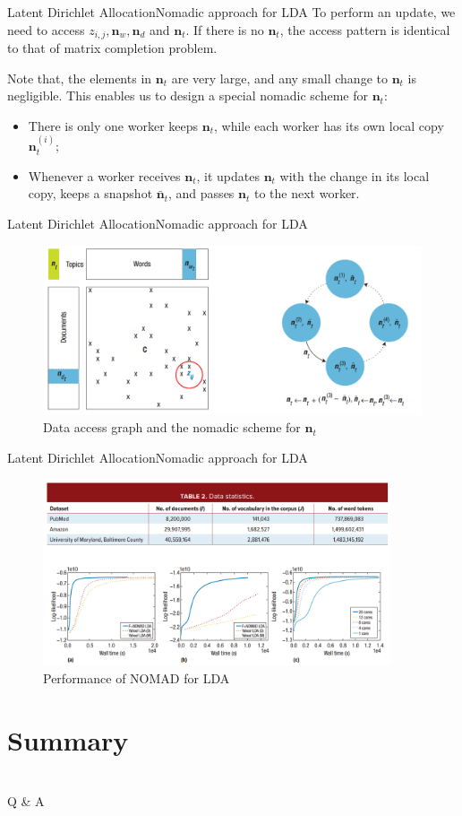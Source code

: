 \documentclass{beamer}
\renewcommand{\vec}{\mathbf}
\begin{document}
  \begin{frame}{Latent Dirichlet Allocation}{Nomadic approach for LDA}
    To perform an update, we need to access $z_{i, j}, \vec{n}_w, \vec{n}_d$ and $\vec{n}_t$. If there is no $\vec{n}_t$, the access pattern is identical to that of matrix completion problem. \par
    \pause
    Note that, the elements in $\vec{n}_t$ are very large, and any small change to $\vec{n}_t$ is negligible. This enables us to design a special nomadic scheme for $\vec{n}_t$:
    \begin{itemize}
      \item There is only one worker keeps $\vec{n}_t$, while each worker has its own local copy $\vec{n}_t^{(i)}$;
      \item Whenever a worker receives $\vec{n}_t$, it updates $\vec{n}_t$ with the change in its local copy, keeps a snapshot $\vec{\bar{n}}_t$, and passes $\vec{n}_t$ to the next worker.
    \end{itemize}
  \end{frame}
  
  \begin{frame}{Latent Dirichlet Allocation}{Nomadic approach for LDA}
    \begin{figure}
      \includegraphics[height = 5cm]{cgs_data.png}
      \caption{Data access graph and the nomadic scheme for $\vec{n}_t$}
    \end{figure}
  \end{frame}
  
  \begin{frame}{Latent Dirichlet Allocation}{Nomadic approach for LDA}
    \begin{figure}
      \includegraphics[height = 5.5cm]{cgs_perform.png}
      \caption{Performance of NOMAD for LDA}
    \end{figure}
  \end{frame}
  
  \section{Summary}
  
  \section{}
  \begin{frame}{Q \& A}

  \end{frame}
\end{document}
